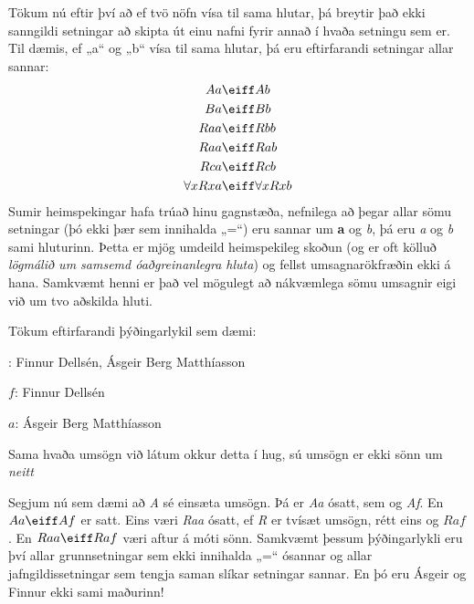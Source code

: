 Tökum nú eftir því að ef tvö nöfn vísa til sama hlutar, þá breytir það ekki sanngildi setningar að skipta út einu nafni fyrir annað í hvaða setningu sem er. Til dæmis, ef „a“ og „b“ vísa til sama hlutar, þá eru eftirfarandi setningar allar sannar: \label{model.nonidentity}
	\begin{align*}
	 	Aa &\eiff Ab \\
	 	Ba &\eiff Bb\\
		Raa &\eiff Rbb\\
		Raa & \eiff Rab\\
		Rca &\eiff Rcb\\
		\forall x Rxa &\eiff \forall x Rxb
	\end{align*}
Sumir heimspekingar hafa trúað hinu gagnstæða, nefnilega að þegar allar sömu setningar (þó ekki þær sem innihalda „=“) eru sannar um \textbf{a} og \emph{b}, þá eru \emph{a} og \emph{b} sami hluturinn. Þetta er mjög umdeild heimspekileg skoðun (og er oft kölluð \emph{lögmálið um samsemd óaðgreinanlegra hluta}) og fellst umsagnarökfræðin ekki á hana. Samkvæmt henni er það vel mögulegt að nákvæmlega sömu umsagnir eigi við um tvo aðskilda hluti.

Tökum eftirfarandi þýðingarlykil sem dæmi:
	\begin{ebullet}
		\item[\text{yfirgrip}:] Finnur Dellsén, Ásgeir Berg Matthíasson
		\item[$f$:] Finnur Dellsén
		\item[$a$:] Ásgeir Berg Matthíasson
		\item Sama hvaða umsögn við látum okkur detta í hug, sú umsögn er ekki sönn um \emph{neitt}
			\end{ebullet}
Segjum nú sem dæmi að \emph{A} sé einsæta umsögn. Þá er \emph{Aa} ósatt, sem og \emph{Af}. En $Aa \eiff Af$ er satt. Eins væri \emph{Raa} ósatt, ef \emph{R} er tvísæt umsögn, rétt eins og $Raf$. En $Raa \eiff Raf$ væri aftur á móti sönn. Samkvæmt þessum þýðingarlykli eru því allar grunnsetningar sem ekki innihalda „=“ ósannar og allar jafngildissetningar sem tengja saman slíkar setningar sannar. En þó eru Ásgeir og Finnur ekki sami maðurinn!		
			
